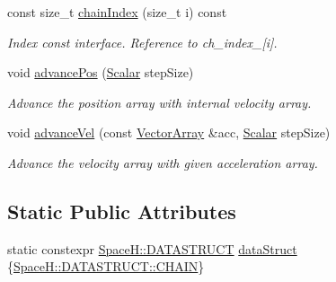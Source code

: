 \begin{DoxyCompactItemize}
const size\+\_\+t \mbox{\hyperlink{class_vel_indep_chain_particles_ad2cec742c8fa63849b9ff5b8876f879a}{chain\+Index}} (size\+\_\+t i) const
\begin{DoxyCompactList}\small\item\em Index const interface. Reference to ch\+\_\+index\+\_\+\mbox{[}i\mbox{]}. \end{DoxyCompactList}\item 
void \mbox{\hyperlink{class_vel_indep_chain_particles_a76124f26a1e37892cd38f533edcbb8e8}{advance\+Pos}} (\mbox{\hyperlink{class_vel_indep_particles_a5d275b22f0d759f360ddd80e78f4b466}{Scalar}} step\+Size)
\begin{DoxyCompactList}\small\item\em Advance the position array with internal velocity array. \end{DoxyCompactList}\item 
void \mbox{\hyperlink{class_vel_indep_chain_particles_aa09b6bf7f9efbe1da4de3d106581b3a6}{advance\+Vel}} (const \mbox{\hyperlink{class_vel_indep_particles_a27580f65b6523bfb6900520af2e44708}{Vector\+Array}} \&acc, \mbox{\hyperlink{class_vel_indep_particles_a5d275b22f0d759f360ddd80e78f4b466}{Scalar}} step\+Size)
\begin{DoxyCompactList}\small\item\em Advance the velocity array with given acceleration array. \end{DoxyCompactList}\end{DoxyCompactItemize}
\subsection*{Static Public Attributes}
\begin{DoxyCompactItemize}
\item 
static constexpr \mbox{\hyperlink{namespace_space_h_a4782f089179a3c269891f02482b072df}{Space\+H\+::\+D\+A\+T\+A\+S\+T\+R\+U\+CT}} \mbox{\hyperlink{class_vel_indep_chain_particles_a58396033a881431db18207bf280892ea}{data\+Struct}} \{\mbox{\hyperlink{namespace_space_h_a0af19f79a6498e99dbda772053d44a72a014d2cf3cdc3af6f4f92c09190860e33}{Space\+H\+::\+D\+A\+T\+A\+S\+T\+R\+U\+C\+T\+::\+C\+H\+A\+IN}}\}
\end{DoxyCompactItemize}
